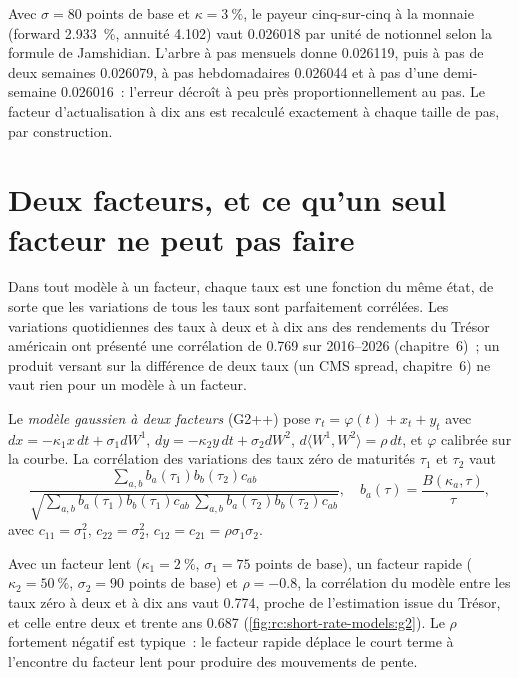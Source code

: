 \begin{example}\label{ex:rc:short-rate-models:tree}
Avec $\sigma = 80$ points de base et $\kappa=3~\%$, le payeur cinq-sur-cinq à la monnaie
(forward 2.933~\%, annuité 4.102) vaut 0.026018 par unité de notionnel selon
la formule de Jamshidian. L'arbre à pas mensuels donne 0.026119, puis
à pas de deux semaines 0.026079, à pas hebdomadaires 0.026044 et à pas d'une demi-semaine
0.026016~: l'erreur décroît à peu près proportionnellement au pas. Le facteur d'actualisation à dix ans
est recalculé exactement à chaque taille de pas, par construction.
\end{example}

\section{Deux facteurs, et ce qu'un seul facteur ne peut pas faire}

Dans tout modèle à un facteur, chaque taux est une fonction du même état, de sorte que
les variations de tous les taux sont parfaitement corrélées. Les variations quotidiennes des taux à deux et à dix ans
des rendements du Trésor américain ont présenté une corrélation de 0.769 sur 2016--2026 (chapitre~6)~; un
produit versant sur la différence de deux taux (un CMS spread, chapitre~6) ne vaut rien
pour un modèle à un facteur.

\begin{definition}\label{def:rc:short-rate-models:g2}
Le \emph{modèle gaussien à deux facteurs} (G2++) pose
$r_t = \varphi(t)+x_t+y_t$ avec $dx = -\kappa_1x\,dt+\sigma_1dW^1$, $dy =
-\kappa_2y\,dt+\sigma_2dW^2$, $d\langle W^1,W^2\rangle = \rho\,dt$, et $\varphi$ calibrée sur
la courbe. La corrélation des variations des taux zéro de maturités $\tau_1$ et
$\tau_2$ vaut
\[
\frac{\sum_{a,b}b_a(\tau_1)b_b(\tau_2)c_{ab}}{\sqrt{\sum_{a,b}b_a(\tau_1)b_b(\tau_1)c_{ab}\,\sum_{a,b}b_a(\tau_2)b_b(\tau_2)c_{ab}}},
\quad b_a(\tau)=\frac{B(\kappa_a,\tau)}{\tau},
\]
avec $c_{11}=\sigma_1^2$, $c_{22}=\sigma_2^2$, $c_{12}=c_{21}=\rho\sigma_1\sigma_2$.
\end{definition}

\begin{example}\label{ex:rc:short-rate-models:g2}
Avec un facteur lent ($\kappa_1=2~\%$, $\sigma_1=75$ points de base), un facteur rapide ($\kappa_2=50~\%$,
$\sigma_2=90$ points de base) et $\rho=-0.8$, la corrélation du modèle entre les taux zéro
à deux et à dix ans vaut 0.774, proche de l'estimation issue du Trésor, et celle entre
deux et trente ans 0.687 (\cref{fig:rc:short-rate-models:g2}). Le $\rho$ fortement
négatif est typique~: le facteur rapide déplace le court terme à l'encontre du facteur
lent pour produire des mouvements de pente.
\end{example}

